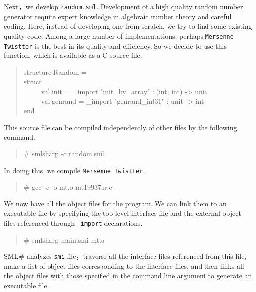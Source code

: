 \documentclass{jbook}
\newcommand{\smlsharp}{SML\#}
\newenvironment{program}{\begin{tt}\begin{quote}}{\end{quote}\end{tt}}
\newcommand{\myem}{\ \ \ \ \  }
\begin{document}
	Next，we develop {\tt random.sml}.
	Development of a high quality random number generator require
expert knowledge in algebraic number theory and careful coding.
	Here, instead of developing one from scratch, we try to find
some existing quality code.
	Among a large number of implementations, perhaps {\tt Mersenne
Twistter} is the best in its quality and efficiency.
	So we decide to use this function, which is available as a C
source file.
\begin{program}
structure Random =\\
struct\\
\myem  val init = \_import "init\_by\_array" : (int, int) -> unit\\
\myem  val genrand = \_import "genrand\_int31" : unit -> int\\
end
\end{program}
	This source file can be compiled independently of other files
by the following command.
\begin{program}
\# smlsharp -c random.sml
\end{program}
	In doing this, we compile {\tt Mersenne Twistter}.
\begin{program}
\# gcc -c -o mt.o mt19937ar.c
\end{program}
	We now have all the object files for the program.
	We can link them to an executable file by specifying the
top-level interface file and the external object files referenced
through {\tt \_import} declarations.
\begin{program}
\# smlsharp main.smi mt.o
\end{program}
	\smlsharp{} analyzes {\tt smi} file，traverse all the interface
files referenced from this file, make a list of object files
corresponding to the interface files, and then links all the object
files with those specified in the command line argument to generate an
executable file.
	
\end{document}
